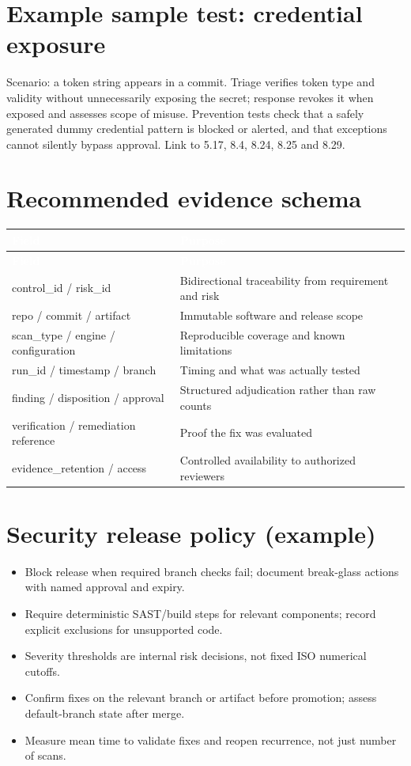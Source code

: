 \documentclass[11pt,letterpaper]{article}
\begin{document}
\section{Example sample test: credential exposure}
Scenario: a token string appears in a commit. Triage verifies token type and validity without unnecessarily exposing the secret; response revokes it when exposed and assesses scope of misuse. Prevention tests check that a safely generated dummy credential pattern is blocked or alerted, and that exceptions cannot silently bypass approval. Link to 5.17, 8.4, 8.24, 8.25 and 8.29.
\section{Recommended evidence schema}
\small{}\begin{longtable}{>{\raggedright\arraybackslash}p{}>{\raggedright\arraybackslash}p{}}
\rowcolor{navy} \textcolor{white}{\textbf{Field}} & \textcolor{white}{\textbf{Purpose}}\\
\endfirsthead
\rowcolor{navy} \textcolor{white}{\textbf{Field}} & \textcolor{white}{\textbf{Purpose}}\\
\endhead
control\_id / risk\_id & Bidirectional traceability from requirement and risk\\
repo / commit / artifact & Immutable software and release scope\\
scan\_type / engine / configuration & Reproducible coverage and known limitations\\
run\_id / timestamp / branch & Timing and what was actually tested\\
finding / disposition / approval & Structured adjudication rather than raw counts\\
verification / remediation reference & Proof the fix was evaluated\\
evidence\_retention / access & Controlled availability to authorized reviewers\\
\end{longtable}\normalsize

\section{Security release policy (example)}
\begin{itemize}
\item Block release when required branch checks fail; document break-glass actions with named approval and expiry.
\item Require deterministic SAST/build steps for relevant components; record explicit exclusions for unsupported code.
\item Severity thresholds are internal risk decisions, not fixed ISO numerical cutoffs.
\item Confirm fixes on the relevant branch or artifact before promotion; assess default-branch state after merge.
\item Measure mean time to validate fixes and reopen recurrence, not just number of scans.
\end{itemize}
\end{document}

